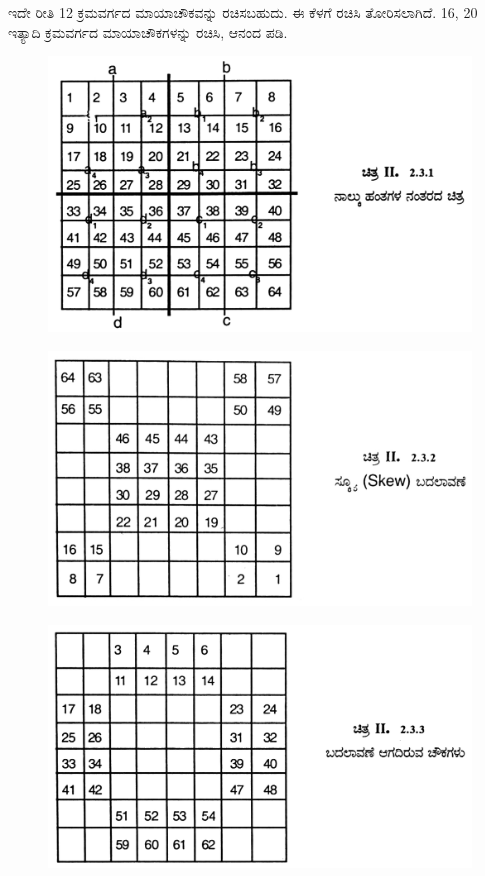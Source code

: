 ಇದೇ ರೀತಿ 12 ಕ್ರಮವರ್ಗದ ಮಾಯಾಚೌಕವನ್ನು ರಚಿಸಬಹುದು. ಈ ಕೆಳಗೆ ರಚಿಸಿ ತೋರಿಸಲಾಗಿದೆ. 16, 20 ಇತ್ಯಾದಿ ಕ್ರಮವರ್ಗದ ಮಾಯಾಚೌಕಗಳನ್ನು ರಚಿಸಿ, ಆನಂದ ಪಡಿ.
\begin{figure}[h]
\includegraphics{src/figures/chap3/fig3.24.jpg}
\end{figure}
\begin{figure}[h]
\includegraphics{src/figures/chap3/fig3.25.jpg}
\end{figure}
\begin{figure}[h]
\includegraphics{src/figures/chap3/fig3.26.jpg}
\end{figure}
